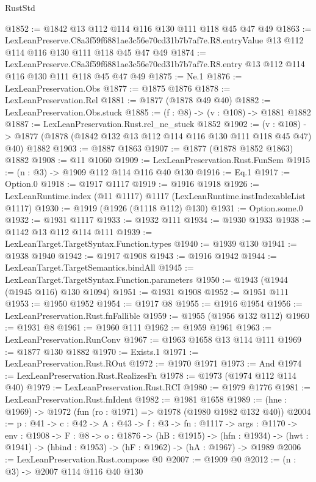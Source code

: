 \begin{lexlean}{RustStd}
\begin{coremodule}
@1852 := @1842 @13 @112 @114 @116 @130 @111 @118 @45 @47 @49
@1863 := LexLeanPreserve.C8a3f59f6881ae3c56e70cd31b7b7af7e.R8.entryValue
    @13
    @112
    @114
    @116
    @130
    @111
    @118
    @45
    @47
    @49
@1874 := LexLeanPreserve.C8a3f59f6881ae3c56e70cd31b7b7af7e.R8.entry
    @13
    @112
    @114
    @116
    @130
    @111
    @118
    @45
    @47
    @49
@1875 := Ne.{1}
@1876 := LexLeanPreservation.Obs
@1877 := @1875 @1876
@1878 := LexLeanPreservation.Rel
@1881 := @1877 (@1878 @49 @40)
@1882 := LexLeanPreservation.Obs.stuck
@1885 := (f : @8) -> (v : @108) -> @1881 @1882
@1887 := LexLeanPreservation.Rust.rel_ne_stuck @1852
@1902 := (v : @108) ->
  @1877 (@1878 (@1842 @132 @13 @112 @114 @116 @130 @111 @118 @45 @47) @40) @1882
@1903 := @1887 @1863
@1907 := @1877 (@1878 @1852 @1863) @1882
@1908 := @11 @1060
@1909 := LexLeanPreservation.Rust.FunSem
@1915 := (n : @3) -> @1909 @112 @114 @116 @40 @130
@1916 := Eq.{1}
@1917 := Option.{0}
@1918 := @1917 @1117
@1919 := @1916 @1918
@1926 := LexLeanRuntime.index (@11 @1117) @1117 (LexLeanRuntime.instIndexableList @1117)
@1930 := @1919 (@1926 (@1118 @112) @130)
@1931 := Option.some.{0}
@1932 := @1931 @1117
@1933 := @1932 @111
@1934 := @1930 @1933
@1938 := @1142 @13 @112 @114 @111
@1939 := LexLeanTarget.TargetSyntax.Function.types
@1940 := @1939 @130
@1941 := @1938 @1940
@1942 := @1917 @1908
@1943 := @1916 @1942
@1944 := LexLeanTarget.TargetSemantics.bindAll
@1945 := LexLeanTarget.TargetSyntax.Function.parameters
@1950 := @1943 (@1944 (@1945 @116) @130 @1094)
@1951 := @1931 @1908
@1952 := @1951 @111
@1953 := @1950 @1952
@1954 := @1917 @8
@1955 := @1916 @1954
@1956 := LexLeanPreservation.Rust.fnFallible
@1959 := @1955 (@1956 @132 @112)
@1960 := @1931 @8
@1961 := @1960 @111
@1962 := @1959 @1961
@1963 := LexLeanPreservation.RunConv
@1967 := @1963 @1658 @13 @114 @111
@1969 := @1877 @130 @1882
@1970 := Exists.{1}
@1971 := LexLeanPreservation.Rust.ROut
@1972 := @1970 @1971
@1973 := And
@1974 := LexLeanPreservation.Rust.RealizesFn
@1978 := @1973 (@1974 @112 @114 @40)
@1979 := LexLeanPreservation.Rust.RCI
@1980 := @1979 @1776
@1981 := LexLeanPreservation.Rust.fnIdent
@1982 := @1981 @1658
@1989 := (hne : @1969) -> @1972 (fun (ro : @1971) => @1978 (@1980 @1982 @132 @40))
@2004 := {p : @41} ->
  {c : @42} ->
  {A : @43} ->
  {f : @3} ->
  {fn : @1117} ->
  {args : @1170} ->
  {env : @1908} ->
  {F : @8} ->
  {o : @1876} ->
  (hB : @1915) ->
  (hfn : @1934) -> (hwt : @1941) -> (hbind : @1953) -> (hF : @1962) -> (hA : @1967) -> @1989
@2006 := LexLeanPreservation.Rust.compose @0
@2007 := @1909 @0
@2012 := (n : @3) -> @2007 @114 @116 @40 @130

\end{coremodule}
\end{lexlean}
